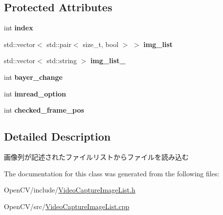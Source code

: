 \subsection*{Protected Attributes}
\begin{DoxyCompactItemize}
\item 
\hypertarget{classskl_1_1_video_capture_image_list_a07a9d7ba42284858346a0b22f79a8546}{}\label{classskl_1_1_video_capture_image_list_a07a9d7ba42284858346a0b22f79a8546} 
int {\bfseries index}
\item 
\hypertarget{classskl_1_1_video_capture_image_list_aa45d84456af4dd8819cd5a1248346659}{}\label{classskl_1_1_video_capture_image_list_aa45d84456af4dd8819cd5a1248346659} 
std\+::vector$<$ std\+::pair$<$ size\+\_\+t, bool $>$ $>$ {\bfseries img\+\_\+list}
\item 
\hypertarget{classskl_1_1_video_capture_image_list_afc70915373577ee01bb546f3b6792075}{}\label{classskl_1_1_video_capture_image_list_afc70915373577ee01bb546f3b6792075} 
std\+::vector$<$ std\+::string $>$ {\bfseries img\+\_\+list\+\_\+}
\item 
\hypertarget{classskl_1_1_video_capture_image_list_ada19dc79dc7bf69d12c91735db419e8a}{}\label{classskl_1_1_video_capture_image_list_ada19dc79dc7bf69d12c91735db419e8a} 
int {\bfseries bayer\+\_\+change}
\item 
\hypertarget{classskl_1_1_video_capture_image_list_abb1a3688f5789ccb88e1f813d31237bb}{}\label{classskl_1_1_video_capture_image_list_abb1a3688f5789ccb88e1f813d31237bb} 
int {\bfseries imread\+\_\+option}
\item 
\hypertarget{classskl_1_1_video_capture_image_list_aca89f798845c8da4039c032705a79953}{}\label{classskl_1_1_video_capture_image_list_aca89f798845c8da4039c032705a79953} 
int {\bfseries checked\+\_\+frame\+\_\+pos}
\end{DoxyCompactItemize}


\subsection{Detailed Description}
画像列が記述されたファイルリストからファイルを読み込む 

The documentation for this class was generated from the following files\+:\begin{DoxyCompactItemize}
\item 
Open\+C\+V/include/\hyperlink{_video_capture_image_list_8h}{Video\+Capture\+Image\+List.\+h}\item 
Open\+C\+V/src/\hyperlink{_video_capture_image_list_8cpp}{Video\+Capture\+Image\+List.\+cpp}\end{DoxyCompactItemize}
